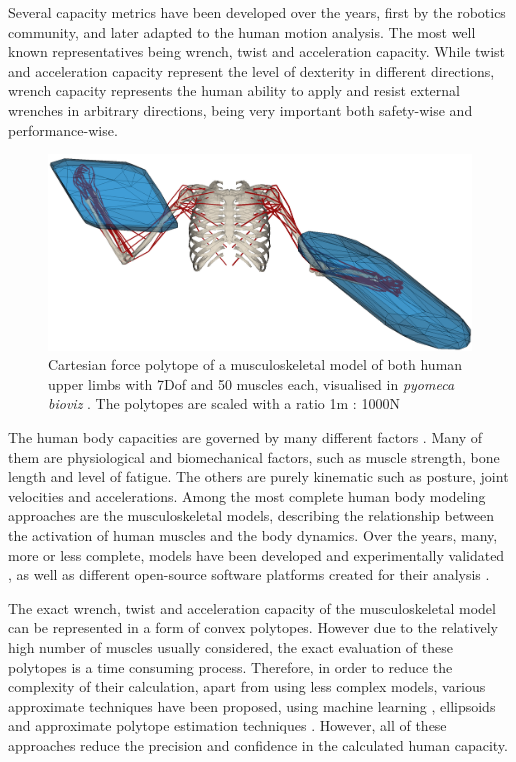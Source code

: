 Several capacity metrics have been developed over the years, first by the robotics community\cite{yoshikawa1985manipulability}\cite{chiacchio_evaluation_1996}, and later adapted to the human motion analysis\cite{sasaki2011vertex}\cite{khatib2009robotics}\cite{biomechanics1010008}. The most well known representatives being wrench, twist and acceleration capacity. While twist and acceleration capacity represent the level of dexterity in different directions, wrench capacity represents the human ability to apply and resist external wrenches in arbitrary directions, being very important both safety-wise and performance-wise. 

\begin{figure}[!t]
    \centering
   \includegraphics[width=0.9\linewidth]{Papers/images/bimanual.png}
    \caption{Cartesian force polytope of a musculoskeletal model of both human upper limbs  \cite{saul2015benchmarking} with 7Dof and 50 muscles each, visualised in \textit{pyomeca bioviz} \cite{Michaud2021}. The polytopes are scaled with a ratio 1m : 1000N}
   \label{fig:polytope_showoff}
\end{figure}

The human body capacities are governed by many different factors \cite{nasa}. Many of them are physiological and biomechanical factors, such as muscle strength, bone length and level of fatigue. The others are purely kinematic such as posture, joint velocities and accelerations. 
Among the most complete human body modeling approaches are the musculoskeletal models, describing the relationship between the activation of human muscles and the body dynamics. 
Over the years, many, more or less complete, models have been developed and experimentally validated \cite{holzbaur2005model}\cite{WU20163626}\cite{rajagopal2016fullbody}, as well as different open-source software platforms created for their analysis \cite{opensim}\cite{Michaud2021}. 

The exact wrench, twist and acceleration capacity of the musculoskeletal model can be represented in a form of convex polytopes. However due to the relatively high number of muscles usually considered, the exact evaluation of these polytopes is a time consuming process. Therefore, in order to reduce the complexity of their calculation, apart from using less complex models, various approximate techniques have been proposed, using machine learning \cite{hernandez2018force}, ellipsoids \cite{petric2019assistive} and approximate polytope estimation techniques \cite{carmichael2011Towards}\cite{chen2018strength}.  However, all of these approaches reduce the precision and confidence in the calculated human capacity. 


